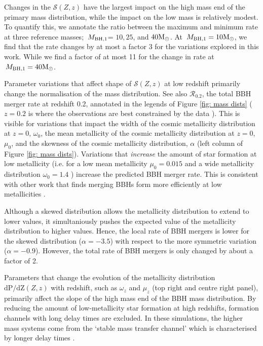 \documentclass[twocolumn]{aastex631}
\newcommand{\Msun}{\ensuremath{\rm{M}_{\odot}}\xspace}
\newcommand{\Mbheen}{\ensuremath{\,M_{\rm BH, 1}}\xspace}
\newcommand{\SFRDzZ}{\ensuremath{\mathcal{S}(Z,z)}\xspace}
\newcommand{\dpdZ}{\ensuremath{\mathrm{dP/dZ}(Z,z)}\xspace}
\begin{document}
Changes in the \SFRDzZ have the largest impact on the high mass end of the primary mass distribution, while the impact on the low mass is relatively modest.
To quantify this, we annotate the ratio between the maximum and minimum rate at three reference masses; \Mbheen = $10, 25$, and $40\Msun$.
At $\Mbheen=10\Msun$, we find that the rate changes by at most a factor 3 for the variations explored in this work. While we find a factor of at most 11 for the change in rate at $\Mbheen=40\Msun$. 


Parameter variations that affect shape of \SFRDzZ at low redshift primarily change the normalisation of the mass distribution. See also  $\mathcal{R}_{0.2}$, the total BBH merger rate at redshift 0.2, annotated in the legends of Figure \ref{fig: mass dists} ($z=0.2$ is where the observations are best constrained by the data \citealt{GWTC3_popPaper2021}). 
This is visible for variations that impact the width of the cosmic metallicity distribution at $z=0$, $\omega_0$, the mean metallicity of the cosmic metallicity distribution at $z=0$, $\mu_0$, and the skewness of the cosmic metallicity distribution, $\alpha$ (left column of Figure \ref{fig: mass dists}).
Variations that \textit{increase} the amount of star formation at low metallicity (i.e. for a low mean metallicity $\mu_0=0.015$ and a wide metallicity distribution $\omega_0 = 1.4$ ) increase the predicted BBH merger rate. This is consistent with other work that finds merging BBHs form more efficiently at low metallicities \citep[e.g.][]{BelczynskiVink2010, Stevenson+2017,Mapelli2017,Chruslinska2019_effectCO,Broekgaarden+2021b}.

Although a skewed distribution allows the metallicity distribution to extend to lower values, it simultaniously pushes the expected value of the metallicity distribution to higher values. Hence, the local rate of BBH mergers is lower for the skewed distribution ($\alpha = -3.5$) with respect to the more symmetric variation ($\alpha = -0.9$). However, the total rate of BBH mergers is only changed by about a factor of 2. 


Parameters that change the evolution of the metallicity distribution \dpdZ with redshift, such as $\omega_z$ and $\mu_z$ (top right and centre right panel), primarily affect the slope of the high mass end of the BBH mass distribution.
By reducing the amount of low-metallicity star formation at high redshifts, formation channels with long delay times are excluded. In these simulations, the higher mass systems come from the `stable mass transfer channel' which is characterised by longer delay times \citep[][see also their Figure 6]{vanson+2022}.  
\end{document}
